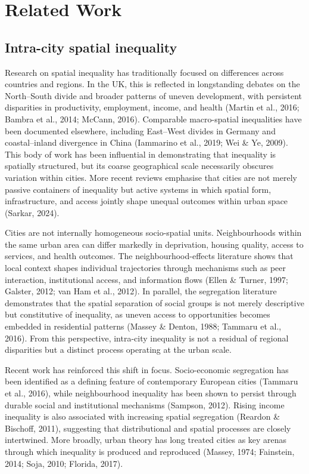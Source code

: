 \section{Related Work}

\subsection{Intra-city spatial inequality}

Research on spatial inequality has traditionally focused on differences across countries and regions. In the UK, this is reflected in longstanding debates on the North--South divide and broader patterns of uneven development, with persistent disparities in productivity, employment, income, and health (Martin et al., 2016; Bambra et al., 2014; McCann, 2016). Comparable macro-spatial inequalities have been documented elsewhere, including East--West divides in Germany and coastal--inland divergence in China (Iammarino et al., 2019; Wei \& Ye, 2009). This body of work has been influential in demonstrating that inequality is spatially structured, but its coarse geographical scale necessarily obscures variation within cities. More recent reviews emphasise that cities are not merely passive containers of inequality but active systems in which spatial form, infrastructure, and access jointly shape unequal outcomes within urban space (Sarkar, 2024).

Cities are not internally homogeneous socio-spatial units. Neighbourhoods within the same urban area can differ markedly in deprivation, housing quality, access to services, and health outcomes. The neighbourhood-effects literature shows that local context shapes individual trajectories through mechanisms such as peer interaction, institutional access, and information flows (Ellen \& Turner, 1997; Galster, 2012; van Ham et al., 2012). In parallel, the segregation literature demonstrates that the spatial separation of social groups is not merely descriptive but constitutive of inequality, as uneven access to opportunities becomes embedded in residential patterns (Massey \& Denton, 1988; Tammaru et al., 2016). From this perspective, intra-city inequality is not a residual of regional disparities but a distinct process operating at the urban scale.

Recent work has reinforced this shift in focus. Socio-economic segregation has been identified as a defining feature of contemporary European cities (Tammaru et al., 2016), while neighbourhood inequality has been shown to persist through durable social and institutional mechanisms (Sampson, 2012). Rising income inequality is also associated with increasing spatial segregation (Reardon \& Bischoff, 2011), suggesting that distributional and spatial processes are closely intertwined. More broadly, urban theory has long treated cities as key arenas through which inequality is produced and reproduced (Massey, 1974; Fainstein, 2014; Soja, 2010; Florida, 2017).


